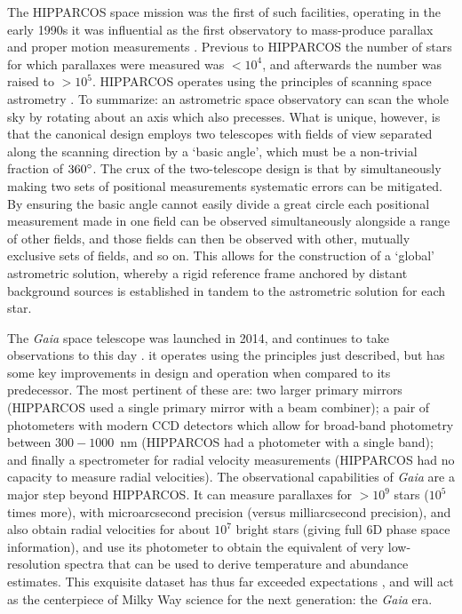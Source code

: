 The HIPPARCOS space mission was the first of such facilities, operating in the early 1990s it was influential as the first observatory to mass-produce parallax and proper motion measurements \parencite{hipparcos}. Previous to HIPPARCOS the number of stars for which parallaxes were measured was $< 10^{4}$, and afterwards the number was raised to $> 10^{5}$. HIPPARCOS operates using the principles of scanning space astrometry \parencite[see][]{lindegren10}. To summarize: an astrometric space observatory can scan the whole sky by rotating about an axis which also precesses. What is unique, however, is that the canonical design employs two telescopes with fields of view separated along the scanning direction by a `basic angle', which must be a non-trivial fraction of $360\hbox{$^\circ$}$. The crux of the two-telescope design is that by simultaneously making two sets of positional measurements systematic errors can be mitigated. By ensuring the basic angle cannot easily divide a great circle each positional measurement made in one field can be observed simultaneously alongside a range of other fields, and those fields can then be observed with other, mutually exclusive sets of fields, and so on. This allows for the construction of a `global' astrometric solution, whereby a rigid reference frame anchored by distant background sources is established in tandem to the astrometric solution for each star.

The \textit{Gaia} space telescope was launched in 2014, and continues to take observations to this day \parencite[see][ for design specifications and related references]{gaia}. it operates using the principles just described, but has some key improvements in design and operation when compared to its predecessor. The most pertinent of these are: two larger primary mirrors (HIPPARCOS used a single primary mirror with a beam combiner); a pair of photometers with modern CCD detectors which allow for broad-band photometry between $300-1000$~nm (HIPPARCOS had a photometer with a single band); and finally a spectrometer for radial velocity measurements (HIPPARCOS had no capacity to measure radial velocities). The observational capabilities of \textit{Gaia} are a major step beyond HIPPARCOS. It can measure parallaxes for $> 10^{9}$ stars ($10^{5}$ times more), with microarcsecond precision (versus milliarcsecond precision), and also obtain radial velocities for about $10^{7}$ bright stars (giving full 6D phase space information), and use its photometer to obtain the equivalent of very low-resolution spectra that can be used to derive temperature and abundance estimates. This exquisite dataset has thus far exceeded expectations \parencite[e.g. see a commentary and review by][shortly after the second data release]{brown21}, and will act as the centerpiece of Milky Way science for the next generation: the \textit{Gaia} era.

